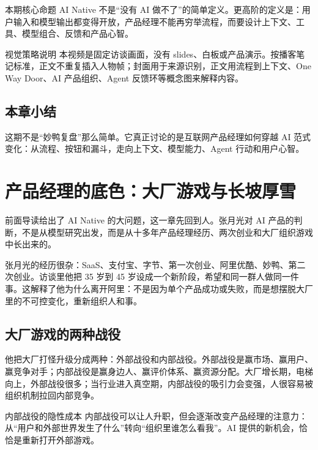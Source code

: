 \documentclass[a4paper]{article}
\begin{document}
\begin{importantbox}{本期核心命题}
AI Native 不是“没有 AI 做不了”的简单定义。更高阶的定义是：用户输入和模型输出都变得开放，产品经理不能再穷举流程，而要设计上下文、工具、模型组合、反馈和产品心智。
\end{importantbox}

\begin{knowledgebox}{视觉策略说明}
本视频是固定访谈画面，没有 slides、白板或产品演示。按播客笔记标准，正文不重复插入人物帧；封面用于来源识别，正文用流程到上下文、One Way Door、AI 产品组织、Agent 反馈环等概念图来解释内容。
\end{knowledgebox}

\subsection{本章小结}

这期不是“妙鸭复盘”那么简单。它真正讨论的是互联网产品经理如何穿越 AI 范式变化：从流程、按钮和漏斗，走向上下文、模型能力、Agent 行动和用户心智。

\section{产品经理的底色：大厂游戏与长坡厚雪}

前面导读给出了 AI Native 的大问题，这一章先回到人。张月光对 AI 产品的判断，不是从模型研究出发，而是从十多年产品经理经历、两次创业和大厂组织游戏中长出来的。

张月光的经历很杂：SaaS、支付宝、字节、第一次创业、阿里优酷、妙鸭、第二次创业。访谈里他把 35 岁到 45 岁设成一个新阶段，希望和同一群人做同一件事。这解释了他为什么离开阿里：不是因为单个产品成功或失败，而是想摆脱大厂里的不可控变化，重新组织人和事。

\subsection{大厂游戏的两种战役}

他把大厂打怪升级分成两种：外部战役和内部战役。外部战役是赢市场、赢用户、赢竞争对手；内部战役是赢身边人、赢评价体系、赢资源分配。大厂增长期，电梯向上，外部战役很多；当行业进入真空期，内部战役的吸引力会变强，人很容易被组织机制拉回内部竞争。

\begin{warningbox}{内部战役的隐性成本}
内部战役可以让人升职，但会逐渐改变产品经理的注意力：从“用户和外部世界发生了什么”转向“组织里谁怎么看我”。AI 提供的新机会，恰恰是重新打开外部游戏。
\end{warningbox}
\end{document}
